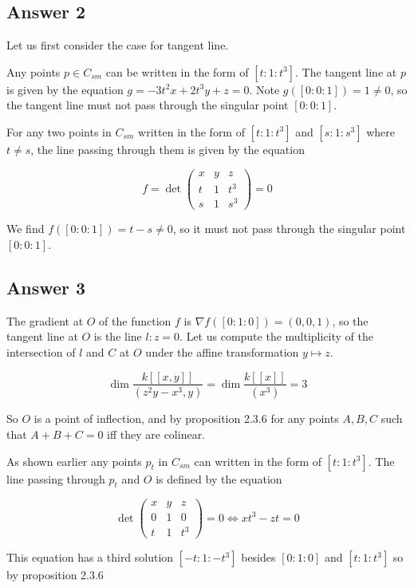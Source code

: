 \documentclass{article}
\theoremstyle{definition}
\theoremstyle{definition}
\theoremstyle{remark}
\begin{document}
\subsection*{Answer 2}

Let us first consider the case for tangent line.

Any points $p \in C_{sm}$ can be written in the form of $[t: 1 : t^3]$. 
The tangent line at $p$ is given by the equation $g = -3t^2x + 2t^3 y + z = 0$. 
Note $g([0:0:1])  = 1 \neq 0$, so the tangent line must not pass through the singular point $[0:0:1]$.

For any two points in $C_{sm}$ written in the form of $[t: 1: t^3]$ and $[s: 1: s^3]$ where $t \neq s$, the line passing through them is given by the equation 

$$f = \det \begin{pmatrix}
	x & y & z \\
	t & 1 & t^3 \\
	s & 1 & s^3
\end{pmatrix} = 0
$$

We find $f([0:0:1]) = t -s \neq 0$, so it must not pass through the singular point $[0:0:1]$.

\subsection*{Answer 3}

The gradient at $O$ of the function $f$ is $\nabla f ([0: 1: 0]) = (0, 0, 1)$, so the tangent line at $O$ is the line $l: z = 0$.
Let us compute the multiplicity of the intersection of $l$ and $C$ at $O$ under the affine transformation $y \mapsto z$.

$$
\dim \frac{k[[x, y]]}{(z^2y - x^3, y)} = \dim \frac{k[[x]]}{(x^3)} = 3
$$
  
So $O$ is a point of inflection, and by proposition 2.3.6 for any points $A, B, C$ such that $A + B + C = 0$ iff they are colinear.

As shown earlier any points $p_t$ in $C_{sm}$ can written in the form of $[t: 1 : t^3]$. 
The line passing through $p_t$ and $O$ is defined by the equation

$$
\det \begin{pmatrix}
	x & y & z \\
	0 & 1 & 0\\
	t & 1 & t^3 
\end{pmatrix} = 0 \iff xt^3 - zt = 0
$$

This equation has a third solution $[-t: 1 : -t^3]$ besides $[0: 1: 0]$ and $[t: 1: t^3]$ so by proposition 2.3.6
\end{document}
